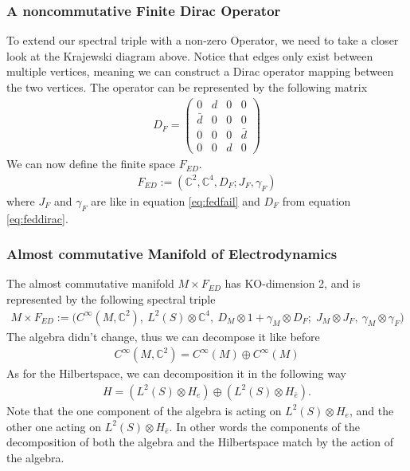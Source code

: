 \subsubsection{A noncommutative Finite Dirac Operator}
To extend our spectral triple with a non-zero Operator, we need to take a
closer look at the Krajewski diagram above. Notice that edges only exist
between multiple vertices, meaning we can construct a Dirac operator mapping
between the two vertices. The operator can be represented by the following matrix
\begin{align}\label{eq:feddirac}
    D_F =
    \begin{pmatrix}
    0 & d & 0 & 0 \\
    \bar{d} & 0 & 0 & 0 \\
    0 & 0 & 0 & \bar{d} \\
    0 & 0 & d & 0
    \end{pmatrix}
\end{align}
We can now define the finite space $F_{ED}$.
\begin{align}
    F_{ED} := (\mathbb{C}^2, \mathbb{C}^4, D_F; J_F, \gamma_F)
\end{align}
where $J_F$ and $\gamma_F$ are like in equation \ref{eq:fedfail} and $D_F$
from equation \ref{eq:feddirac}.

\subsubsection{Almost commutative Manifold of Electrodynamics}
The almost commutative manifold $M\times F_{ED}$ has KO-dimension 2, and is
represented by the following spectral triple
\begin{align}\label{eq:almost commutative manifold}
    M\times F_{ED} := \big(C^\infty(M,\mathbb{C}^2),\ L^2(S)\otimes
    \mathbb{C}^4,\
    D_M\otimes 1 +\gamma _M \otimes D_F;\; J_M\otimes J_F,\ \gamma_M\otimes
    \gamma _F\big)
\end{align}
The algebra didn't change, thus we can decompose it like before
\begin{align}
    C^\infty(M, \mathbb{C}^2) = C^\infty (M) \oplus C^\infty (M)
\end{align}
As for the Hilbertspace, we can decomposition it in the following way
\begin{align}
    H = (L^2(S) \otimes H_e ) \oplus (L^2(S) \otimes H_{\bar{e}}).
\end{align}
Note that the one component of the algebra is acting on $L^2(S) \otimes H_e$,
and the other one acting on $L^2(S) \otimes H_{\bar{e}}$. In other words the components of
the decomposition of both the algebra and the Hilbertspace match by the action of
the algebra.

